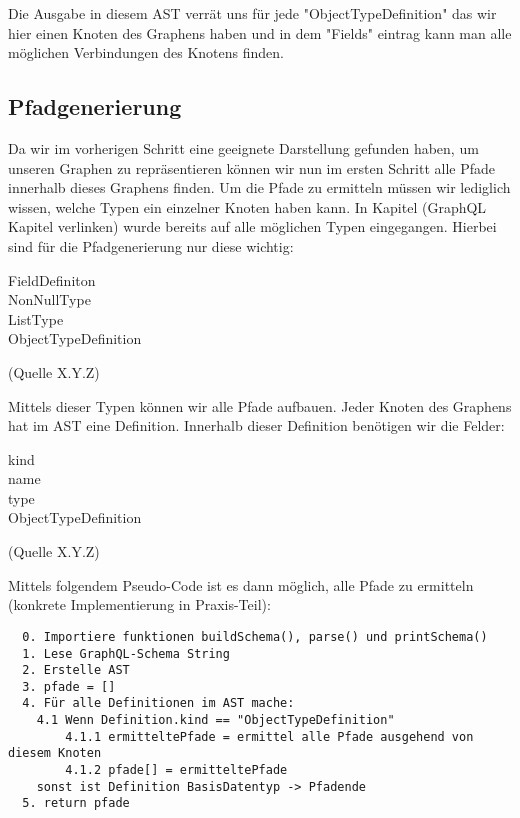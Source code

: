 Die Ausgabe in diesem AST verrät uns für jede "ObjectTypeDefinition" das wir hier einen Knoten des Graphens haben
und in dem "Fields" eintrag kann man alle möglichen Verbindungen des Knotens finden.

\subsection{Pfadgenerierung}

Da wir im vorherigen Schritt eine geeignete Darstellung gefunden haben, um unseren Graphen zu repräsentieren können wir
nun im ersten Schritt alle Pfade innerhalb dieses Graphens finden.
Um die Pfade zu ermitteln müssen wir lediglich wissen, welche Typen ein einzelner Knoten haben kann.
In Kapitel (GraphQL Kapitel verlinken) wurde bereits auf alle möglichen Typen eingegangen.
Hierbei sind für die Pfadgenerierung nur diese wichtig:
\begin{center}
  \begin{description}
    \item[FieldDefiniton]
    \item[NonNullType]
    \item[ListType]
    \item[ObjectTypeDefinition]
  \end{description} (Quelle X.Y.Z)
\end{center}
Mittels dieser Typen können wir alle Pfade aufbauen.
Jeder Knoten des Graphens hat im AST eine Definition.
Innerhalb dieser Definition benötigen wir die Felder:
\begin{center}
  \begin{description}
    \item[kind]
    \item[name]
    \item[type]
    \item[ObjectTypeDefinition]
  \end{description} (Quelle X.Y.Z)
\end{center}
Mittels folgendem Pseudo-Code ist es dann möglich, alle Pfade zu ermitteln (konkrete Implementierung in Praxis-Teil):

\begin{verbatim}
  0. Importiere funktionen buildSchema(), parse() und printSchema()
  1. Lese GraphQL-Schema String
  2. Erstelle AST
  3. pfade = []
  4. Für alle Definitionen im AST mache:
    4.1 Wenn Definition.kind == "ObjectTypeDefinition"
        4.1.1 ermitteltePfade = ermittel alle Pfade ausgehend von diesem Knoten
        4.1.2 pfade[] = ermitteltePfade
    sonst ist Definition BasisDatentyp -> Pfadende
  5. return pfade
\end{verbatim}


